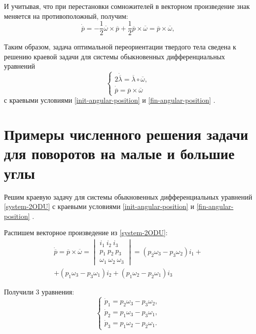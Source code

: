 \documentclass[14pt]{extreport}
\begin{document}
И учитывая, что при перестановки сомножителей в векторном произведение знак меняется на противоположный, получим:
\begin{equation}
\dot{\overline{p}}=-\dfrac{1}{2} \overline{\omega} \times \overline{p}+
\dfrac{1}{2} \overline{p} \times \overline{\omega} = \overline{p} \times \overline{\omega},
\end{equation}

Таким образом, задача оптимальной переориентации твердого тела сведена к решению краевой задачи для системы обыкновенных дифференциальных уравнений
\begin{equation}
\label{system-2ODU}
\begin{cases}
	2\dot{\overline{\lambda}} = \overline{\lambda} \circ \overline{\omega},\\
	\dot{\overline{p}} = \overline{p} \times \overline{\omega}
\end{cases}
\end{equation}
с краевыми условиями \eqref{init-angular-position} и \eqref{fin-angular-position} \cite{mechanics}.

\chapter{Примеры численного решения задачи для поворотов на малые и большие углы}
Решим краевую задачу для системы обыкновенных дифференци­альных уравнений \eqref{system-2ODU} с краевыми условиями \eqref{init-angular-position} и \eqref{fin-angular-position} \cite{antipova}.

Распишем векторное произведение из \eqref{system-2ODU}:
\begin{equation}
\begin{split}
\dot{\overline{p}}=\overline{p} \times \overline{\omega} =
\begin{vmatrix}
  i_{1}\ i_{2}\ i_{3}\\
  p_{1}\ p_{2}\ p_{3}\\
  \omega_{1}\ \omega_{2}\ \omega_{3}
\end{vmatrix}=
(p_2 \omega_3 - p_3 \omega_2)i_1 +\\
+ (p_1 \omega_3 - p_3 \omega_1)i_2 + (p_1 \omega_2 - p_2 \omega_1)i_3
\end{split}
\end{equation}

Получили 3 уравнения:
\begin{equation}
\begin{cases}
\dot{p}_1 = p_2 \omega_3 - p_3 \omega_2,\\
\dot{p}_2 = p_1 \omega_3 - p_3 \omega_1,\\
\dot{p}_3 = p_1 \omega_2 - p_2 \omega_1.
\end{cases}
\end{equation}
\end{document}
